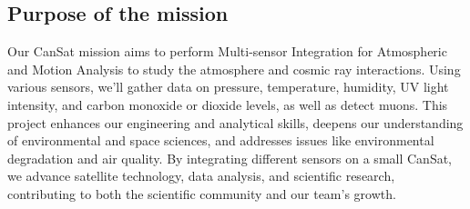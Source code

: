 \subsection{Purpose of the mission}

Our CanSat mission aims to perform Multi-sensor Integration for Atmospheric and Motion Analysis to study the atmosphere and cosmic ray interactions. Using various sensors, we'll gather data on pressure, temperature, humidity, UV light intensity, and carbon monoxide or dioxide levels, as well as detect muons. This project enhances our engineering and analytical skills, deepens our understanding of environmental and space sciences, and addresses issues like environmental degradation and air quality. By integrating different sensors on a small CanSat, we advance satellite technology, data analysis, and scientific research, contributing to both the scientific community and our team's growth.